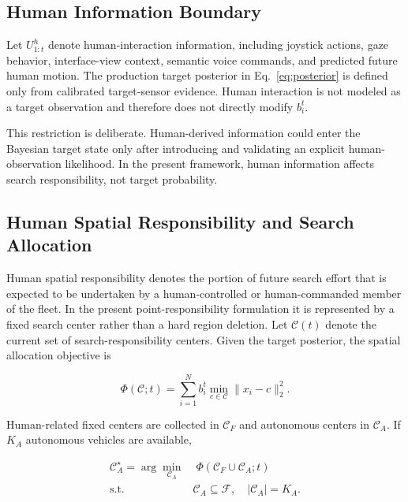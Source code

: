 \documentclass[conference]{IEEEtran}
\begin{document}
\subsection{Human Information Boundary}

Let $U_{1:t}^{h}$ denote human-interaction information, including joystick
actions, gaze behavior, interface-view context, semantic voice commands, and
predicted future human motion. The production target posterior in
Eq.~\eqref{eq:posterior} is defined only from calibrated target-sensor
evidence. Human interaction is not modeled as a target observation and
therefore does not directly modify $b_i^t$.

This restriction is deliberate. Human-derived information could enter the
Bayesian target state only after introducing and validating an explicit human-
observation likelihood. In the present framework, human information affects
search responsibility, not target probability.

\subsection{Human Spatial Responsibility and Search Allocation}

Human spatial responsibility denotes the portion of future search effort that
is expected to be undertaken by a human-controlled or human-commanded member of
the fleet. In the present point-responsibility formulation it is represented by
a fixed search center rather than a hard region deletion. Let $\mathcal{C}(t)$
denote the current set of search-responsibility centers.
Given the target posterior, the spatial allocation objective is

\begin{equation}
\Phi(\mathcal{C};t)=
\sum_{i=1}^{N}
b_i^t\min_{c\in\mathcal{C}}\|x_i-c\|_2^2.
\label{eq:responsibility_objective}
\end{equation}

Human-related fixed centers are collected in $\mathcal{C}_F$ and autonomous
centers in $\mathcal{C}_A$. If $K_A$ autonomous vehicles are available,

\begin{equation}
\begin{aligned}
\mathcal{C}_A^{\star}
=\arg\min_{\mathcal{C}_A}
&\;\Phi(\mathcal{C}_F\cup\mathcal{C}_A;t)\\[-1mm]
\text{s.t. }&\mathcal{C}_A\subseteq\mathcal{F},\quad
|\mathcal{C}_A|=K_A.
\end{aligned}
\label{eq:constrained_responsibility}
\end{equation}
\end{document}
